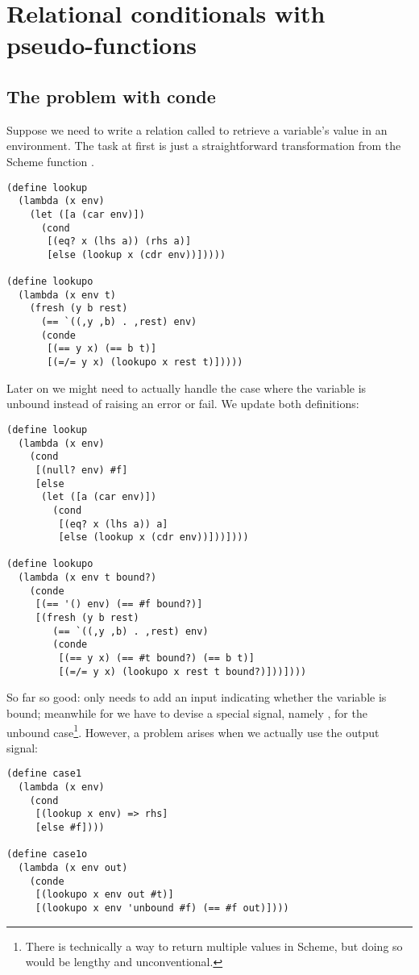 \section{Relational conditionals with pseudo-functions}\label{reif}
\subsection{The problem with conde}
Suppose we need to write a relation called  to retrieve a variable's value in an environment. The task at first is just a straightforward transformation from the Scheme function .
\begin{lstlisting}
(define lookup
  (lambda (x env)
    (let ([a (car env)])
      (cond
       [(eq? x (lhs a)) (rhs a)]
       [else (lookup x (cdr env))]))))

(define lookupo
  (lambda (x env t)
    (fresh (y b rest)
      (== `((,y ,b) . ,rest) env)
      (conde
       [(== y x) (== b t)]
       [(=/= y x) (lookupo x rest t)]))))
\end{lstlisting}

Later on we might need to actually handle the case where the variable is unbound instead of raising an error or fail. We update both definitions:
\begin{lstlisting}
(define lookup
  (lambda (x env)
    (cond
     [(null? env) #f]
     [else
      (let ([a (car env)])
        (cond
         [(eq? x (lhs a)) a]
         [else (lookup x (cdr env))]))])))

(define lookupo
  (lambda (x env t bound?)
    (conde
     [(== '() env) (== #f bound?)]
     [(fresh (y b rest)
        (== `((,y ,b) . ,rest) env)
        (conde
         [(== y x) (== #t bound?) (== b t)]
         [(=/= y x) (lookupo x rest t bound?)]))])))
\end{lstlisting}

So far so good:  only needs to add an input indicating whether the variable is bound; meanwhile for  we have to devise a special signal, namely , for the unbound case\footnote{There is technically a way to return multiple values in Scheme, but doing so would be lengthy and unconventional.}. However, a problem arises when we actually use the output signal:
\begin{lstlisting}
(define case1
  (lambda (x env)
    (cond
     [(lookup x env) => rhs]
     [else #f])))

(define case1o
  (lambda (x env out)
    (conde
     [(lookupo x env out #t)]
     [(lookupo x env 'unbound #f) (== #f out)])))
\end{lstlisting}

